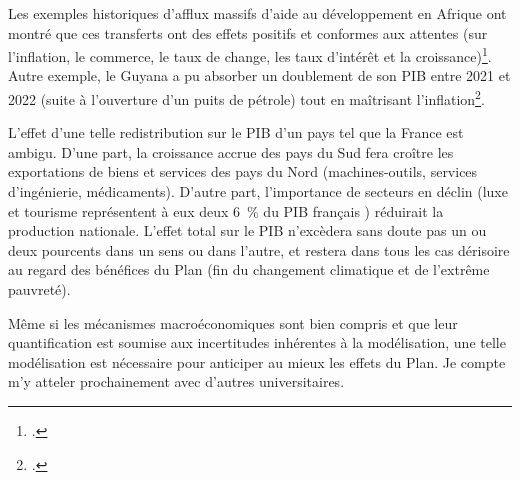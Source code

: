 \documentclass[a5paper,french,openany]{memoir}
\begin{document}
Les exemples historiques d'afflux massifs d'aide au développement en Afrique ont montré que ces transferts ont des effets positifs et conformes aux attentes (sur l'inflation, le commerce, le taux de change, les taux d'intérêt et la croissance)\footnote{\cite{strand_revenue_2009,berg_macroeconomics_2007}.}. Autre exemple, le Guyana a pu absorber un doublement de son PIB entre 2021 et 2022 (suite à l'ouverture d'un puits de pétrole) tout en maîtrisant l'inflation\footnote{\citet{fmi_guyana_2023}.}. 

L'effet d'une telle redistribution sur le PIB d'un pays tel que la France est ambigu. D'une part, la croissance accrue des pays du Sud fera croître les exportations de biens et services des pays du Nord (machines-outils, services d'ingénierie, médicaments). 
D'autre part, l'importance de secteurs en déclin (luxe et tourisme représentent à eux deux 6~\% du PIB français%
) réduirait la production nationale. L'effet total sur le PIB n'excèdera sans doute pas un ou deux pourcents dans un sens ou dans l'autre, et restera dans tous les cas dérisoire au regard des bénéfices du Plan (fin du changement climatique et de l'extrême pauvreté). 

Même si les mécanismes macroéconomiques sont bien compris et que leur quantification est soumise aux incertitudes inhérentes à la modélisation, une telle modélisation est nécessaire pour anticiper au mieux les effets du Plan. Je compte m'y atteler prochainement avec d'autres universitaires.
\end{document}
